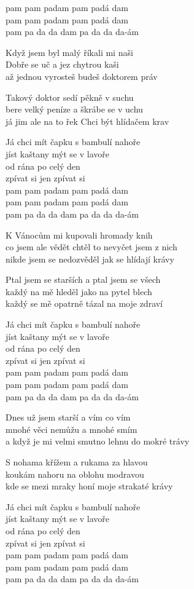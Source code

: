 \begin{text}
pam pam padam pam padá dam\\
pam pam padam pam padá dam\\
pam pa da da dam pa da da da-ám

Když jsem byl malý říkali mi naši\\
Dobře se uč a jez chytrou kaši\\
až jednou vyrosteš budeš doktorem práv

Takový doktor sedí pěkně v suchu\\
bere velký peníze a škrábe se v uchu\\
já jim ale na to řek Chci být hlídačem krav

Já chci mít čapku s bambulí nahoře\\
jíst kaštany mýt se v lavoře\\
od rána po celý den\\
zpívat si jen zpívat si\\
pam pam padam pam padá dam\\
pam pam padam pam padá dam\\
pam pa da da dam pa da da da-ám

K Vánocům mi kupovali hromady knih\\
co jsem ale vědět chtěl to nevyčet jsem z nich\\
nikde jsem se nedozvěděl jak se hlídají krávy

Ptal jsem se starších a ptal jsem se všech\\
každý na mě hleděl jako na pytel blech\\
každý se mě opatrně tázal na moje zdraví

Já chci mít čapku s bambulí nahoře\\
jíst kaštany mýt se v lavoře\\
od rána po celý den\\
zpívat si jen zpívat si\\
pam pam padam pam padá dam\\
pam pam padam pam padá dam\\
pam pa da da dam pa da da da-ám

Dnes už jsem starší a vím co vím\\
mnohé věci nemůžu a mnohé smím\\
a když je mi velmi smutno lehnu do mokré trávy

S nohama křížem a rukama za hlavou\\
koukám nahoru na oblohu modravou\\
kde se mezi mraky honí moje strakaté krávy

Já chci mít čapku s bambulí nahoře\\
jíst kaštany mýt se v lavoře\\
od rána po celý den\\
zpívat si jen zpívat si\\
pam pam padam pam padá dam\\
pam pam padam pam padá dam\\
pam pa da da dam pa da da da-ám
\end{text}
\begin{chord}
\end{chord}